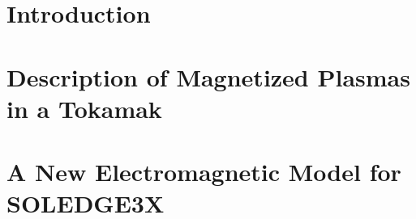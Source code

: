 \documentclass[english]{amu_these}
\begin{document}
	
										





	\tableofcontents					%
	\listoffigures						%
	\listoftables						%
	\printglossary[						%
		type=\acronymtype,
		title={List of acronymes},
		toctitle={List of acronymes}
		]
	\printglossary[						%
		title={Glossary},
		toctitle={Glossary}
		]
	\printglossary[						%
		type=notation,
		title={Naming convention},
		toctitle={Naming convention}
		]

	\ohead{\leftmark\Ifstr{\rightmark}{\leftmark}{}{ -- \rightmark}}	%
	
	\clearpage
	
	\part[Introduction]{Introduction}
	\label{part:Intro}
	
	
	\part[Description of Magnetized Plasmas in a Tokamak]{Description of Magnetized Plasmas in a Tokamak}
	\label{part:FundamentalsPlasmaSimulations}
	
	
	

	\part[An Electromagnetic Model for SOLEDGE3X]{A New Electromagnetic Model for SOLEDGE3X}
	\label{part:ElectromagneticModel}
	
	
	
	
\end{document}
